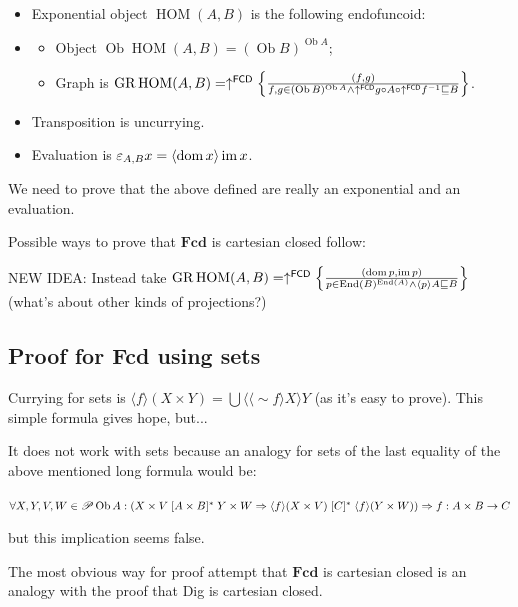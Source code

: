 \begin{itemize}
\item Exponential object $\operatorname{HOM}(A,B)$ is the following endofuncoid:
\item\begin{itemize}
\item Object $\operatorname{Ob}\operatorname{HOM}(A,B) = (\operatorname{Ob} B)^{\operatorname{Ob} A}$;
\item Graph is $\operatorname{GR} \operatorname{HOM} ( A , B) = \uparrow^{\mathsf{FCD}} \left\{ \frac{ ( f , g) }{ f, g \in (\operatorname{Ob}B)^{\operatorname{Ob} A} \wedge \uparrow^{\mathsf{FCD}}g \circ A \circ \uparrow^{\mathsf{FCD}}f^{- 1} \sqsubseteq B }\right\}$.
\end{itemize}
\item Transposition is uncurrying.
\item Evaluation is $\varepsilon_{A, B} x = \langle \operatorname{dom} x \rangle \operatorname{im} x$.
\end{itemize}

We need to prove that the above defined are really an exponential and an evaluation.

Possible ways to prove that $\mathbf{Fcd}$ is cartesian closed follow:

NEW IDEA: Instead take $\operatorname{GR}\operatorname{HOM}(A,B) =
\uparrow^{\mathsf{FCD}}\left\{ \frac{(\operatorname{dom} p,\operatorname{im} p)}{
p\in\operatorname{End}(B)^{\operatorname{End}(A)}\land\left\langle p\right\rangle A\sqsubseteq B}\right\}$ (what's about other
kinds of projections?)

\subsection{Proof for Fcd using sets}

Currying for sets is $\langle f \rangle ( X \times Y) = \bigcup \langle \langle \sim f \rangle X
\rangle Y$ (as it's easy to prove). This simple formula gives hope, but...

It does not work with sets because an analogy for sets of the last equality of the above mentioned long formula would be:

$\forall X, Y, V, W \in \mathscr{P} \operatorname{Ob} A : \left( X \times V \mathrel{[
A \times B]^{\ast}} Y \times W \Rightarrow \langle f \rangle ( X \times V)
\mathrel{[ C]^{\ast}} \langle f \rangle ( Y \times W) \right) \Rightarrow \\ f : A
\times B \rightarrow C$

but this implication seems false.

The most obvious way for proof attempt that $\mathbf{Fcd}$ is cartesian closed is an analogy with the proof that Dig is cartesian closed.

